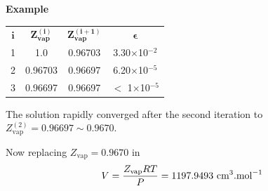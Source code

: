 \begin{MyExample}{\begin{center}{\bf Example}\end{center}}
\begin{enumerate}[a)]
\begin{center}
                     \begin{tabular}{c c c c}
                        \hline
                            $\mathbf{i}$  &  $\mathbf{Z_\text{vap}^{(i)}}$  & $\mathbf{Z_\text{vap}^{(i+1)}}$  & $\mathbf{\epsilon}$ \\  
                               1         &           1.0                 &  0.96703                      &  3.30$\times$10$^{-2}$ \\
                               2         &       0.96703                 &  0.96697                      &  6.20$\times$10$^{-5}$ \\
                               3         &       0.96697                 &  0.96697                      & $<$ 1$\times$10$^{-5}$ \\ 
                        \hline
                     \end{tabular}
                 \end{center}
                 The solution rapidly converged after the second iteration to $Z_{\text{vap}}^{(2)}=0.96697\sim 0.9670$. 
%
           \end{enumerate}
\medskip

           Now replacing $Z_{\text{vap}} = 0.9670$ in 
           \begin{displaymath}
              V=\displaystyle\frac{Z_{\text{vap}}R T}{P} = 1197.9493 \text{ cm}^{3}.\text{mol}^{-1}
           \end{displaymath}
       
   \end{MyExample}



